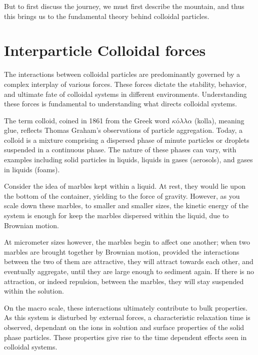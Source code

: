 But to first discuss the journey, we must first describe the mountain, and thus this brings us to the fundamental theory behind colloidal particles.

\section{Interparticle Colloidal forces}

The interactions between colloidal particles are predominantly governed by a complex interplay of various forces. These forces dictate the stability, behavior, and ultimate fate of colloidal systems in different environments. Understanding these forces is fundamental to understanding what directs colloidal systems.

The term colloid, coined in 1861 from the Greek word $κόλλα$ (kolla), meaning glue, reflects Thomas Graham's observations of particle aggregation\cite{old_colloid}. Today, a colloid is a mixture comprising a dispersed phase of minute particles or droplets suspended in a continuous phase. The nature of these phases can vary, with examples including solid particles in liquids, liquids in gases (aerosols), and gases in liquids (foams). 

Consider the idea of marbles kept within a liquid. At rest, they would lie upon the bottom of the container, yielding to the force of gravity\cite{Neuton}. However, as you scale down these marbles, to smaller and smaller sizes, the kinetic energy of the system is enough for keep the marbles dispersed within the liquid, due to Brownian motion\cite{Brown}.

At micrometer sizes however, the marbles begin to affect one another; when two marbles are brought together by Brownian motion, provided the interactions between the two of them are attractive, they will attract towards each other, and eventually aggregate, until they are large enough to sediment again. If there is no attraction, or indeed repulsion, between the marbles, they will stay suspended within the solution.


On the macro scale, these interactions ultimately contribute to bulk properties. As this system is disturbed by external forces, a characteristic relaxation time is observed, dependant on the ions in solution and surface properties of the solid phase particles. 
These properties give rise to the time dependent effects seen in colloidal systems. 

